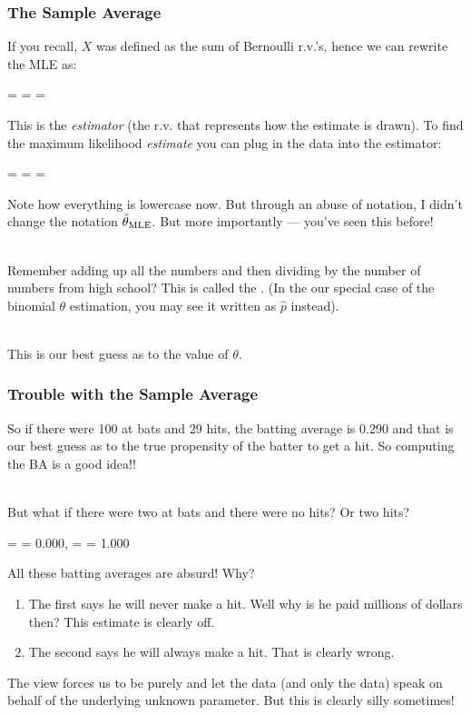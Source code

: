 \documentclass[slides]{beamer} %
\begin{document}
\begin{frame}
	\frametitle{The Sample Average}

\scriptsize
If you recall, $X$ was defined as the sum of Bernoulli r.v.'s, \pause  hence we can rewrite the MLE as:

\beqn
\thetahatmle =  =  = \Xbar
\eeqn\pause 

This is the \emph{estimator} (the r.v. that represents how the estimate is drawn). \pause To find the maximum likelihood \emph{estimate} you can plug in the data into the estimator:\pause 

\beqn
\thetahatmle =  =  = \xbar
\eeqn\pause 

Note how everything is lowercase now. \pause  But through an abuse of notation, I didn't change the notation $\hat{\theta}_{\mathrm{MLE}}$. \pause But more importantly --- you've seen this before! \\~\\\pause 

Remember adding up all the numbers and then dividing by the number of numbers from high school? This is called the . \pause  (In the our special case of the binomial $\theta$ estimation, you may see it written as $\hat{p}$ instead). \\~\\\pause 

This is our best guess as to the value of $\theta$. 

\end{frame}

\begin{frame}
	\frametitle{Trouble with the Sample Average}

\scriptsize
So if there were 100 at bats and 29 hits, the batting average is 0.290 and that is our best guess as to the true propensity of the batter to get a hit. \pause  So computing the BA is a good idea!! \\~\\\pause 

But what if there were two at bats and there were no hits? Or two hits? \pause 

\beqn
\xbar =  = 0.000, \pause \quad\xbar =  = 1.000 
\eeqn\pause 

All these batting averages are absurd!  Why? \pause 

\begin{enumerate}\scriptsize
\item The first says he will never make a hit. Well why is he paid millions of dollars then? This estimate is clearly off. \pause 
\item The second says he will always make a hit. That is clearly wrong. \pause 
\end{enumerate}

The  view forces us to be purely  and let the data (and only the data) speak on behalf of the underlying unknown parameter. \pause  But this is clearly silly sometimes!

\end{frame}
\end{document}
